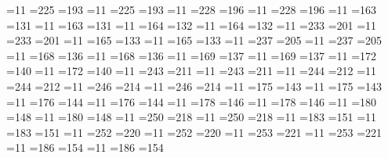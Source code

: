 =11 =225 =193  %
=11 =225 =193  %
=11 =228 =196  %
=11 =228 =196  %
=11 =163 =131  %
=11 =163 =131  %
=11 =164 =132 %
=11 =164 =132  %
=11 =233 =201  %
=11 =233 =201  %
=11 =165 =133  %
=11 =165 =133  %
=11 =237 =205  %
=11 =237 =205  %
=11 =168 =136  %
=11 =168 =136  %
=11 =169 =137  %
=11 =169 =137  %
=11 =172 =140  %
=11 =172 =140  %
=11 =243 =211  %
=11 =243 =211  %
=11 =244 =212  %
=11 =244 =212  %
=11 =246 =214  %
=11 =246 =214  %
=11 =175 =143  %
=11 =175 =143  %
=11 =176 =144  %
=11 =176 =144  %
=11 =178 =146  %
=11 =178 =146  %
=11 =180 =148  %
=11 =180 =148  %
=11 =250 =218  %
=11 =250 =218  %
=11 =183 =151  %
=11 =183 =151  %
=11 =252 =220  %
=11 =252 =220  %
=11 =253 =221  %
=11 =253 =221  %
=11 =186 =154  %
=11 =186 =154  %
					                       
